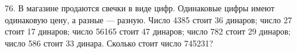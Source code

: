 76. В магазине продаются свечки в виде цифр. Одинаковые цифры имеют одинаковую цену, а разные --- разную. Число 4385 стоит 36 динаров; число 27 стоит 17 динаров; число 56165 стоит 47 динаров; число 782 стоит 29 динаров; число 586 стоит 33 динара. Сколько стоит число 745231?\\
